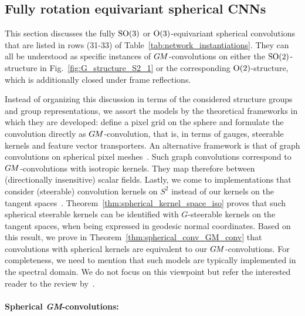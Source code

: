 

\subsection{Fully rotation equivariant spherical CNNs}
\label{sec:spherical_CNNs_fully_equivariant}


This section discusses the fully $\operatorname{SO}(3)$ or $\operatorname{O}(3)$-equivariant spherical convolutions that are listed in rows (31-33) of Table~\ref{tab:network_instantiations}.
They can all be understood as specific instances of $G\mkern-1.4muM$-convolutions on either the $\operatorname{SO}(2)$-structure in Fig.~\ref{fig:G_structure_S2_1} or the corresponding $\operatorname{O}(2)$-structure, which is additionally closed under frame reflections.

Instead of organizing this discussion in terms of the considered structure groups and group representations, we assort the models by the theoretical frameworks in which they are developed:
\citet{kicanaoglu2019gaugeSphere} define a pixel grid on the sphere and formulate the convolution directly as $G\mkern-1.4muM$-convolution, that is, in terms of gauges, steerable kernels and feature vector transporters.
An alternative framework is that of graph convolutions on spherical pixel meshes~\cite{perraudin2018DeepSphere,yang2020rotation}.
Such graph convolutions correspond to $G\mkern-1.4muM$-convolutions with isotropic kernels.
They map therefore between (directionally insensitive) scalar fields.
Lastly, we come to implementations that consider (steerable) convolution kernels on $S^2$ instead of our kernels on the tangent spaces~\cite{esteves2018zonalSpherical,Cohen2018-S2CNN,kondor2018ClebschGordan,esteves2020spinweighted}.
Theorem~\ref{thm:spherical_kernel_space_iso} proves that such spherical steerable kernels can be identified with $G$-steerable kernels on the tangent spaces, when being expressed in geodesic normal coordinates.
Based on this result, we prove in Theorem~\ref{thm:spherical_conv_GM_conv} that convolutions with spherical kernels are equivalent to our $G\mkern-1.4muM$-convolutions.
For completeness, we need to mention that such models are typically implemented in the spectral domain.
We do not focus on this viewpoint but refer the interested reader to the review by~\citet{esteves2020theoretical}.


\paragraph{Spherical \textit{GM}-convolutions:}

